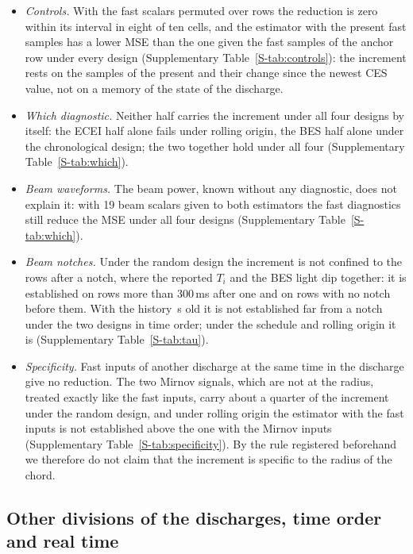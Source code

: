 \documentclass[11pt,a4paper]{article}
\newcommand{\Ti}{\ensuremath{T_i}}
\newcommand{\SuppTab}[1]{Supplementary Table~\ref{S-#1}}
\begin{document}
\begin{itemize}\setlength{\itemsep}{1pt}\setlength{\parskip}{0pt}
\item \emph{Controls.} With the fast scalars permuted over rows the reduction is zero
within its interval in eight of ten cells, and the estimator with the present fast
samples has a lower MSE than the one given the fast samples of the anchor row under every
design (\SuppTab{tab:controls}): the increment rests on the samples of the present and
their change since the newest CES value, not on a memory of the state of the discharge.
\item \emph{Which diagnostic.} Neither half carries the increment under all four designs
by itself: the ECEI half alone fails under rolling origin, the BES half alone under the
chronological design; the two together hold under all four (\SuppTab{tab:which}).
\item \emph{Beam waveforms.} The beam power, known without any diagnostic, does not
explain it: with 19 beam scalars given to both estimators the fast diagnostics still
reduce the MSE under all four designs (\SuppTab{tab:which}).
\item \emph{Beam notches.} Under the random design the increment is not confined to the
rows after a notch, where the reported \Ti{} and the BES light dip together: it is
established on rows more than 300\,ms after one and on rows with no notch before them.
With the history \AgeMedianS\,s old it is not established far from a notch under the two
designs in time order; under the schedule and rolling origin it is (\SuppTab{tab:tau}).
\item \emph{Specificity.} Fast inputs of another discharge at the same time in the
discharge give no reduction. The two Mirnov signals, which are not at the radius, treated
exactly like the fast inputs, carry about a quarter of the increment under the random
design, and under rolling origin the estimator with the fast inputs is not established
above the one with the Mirnov inputs (\SuppTab{tab:specificity}). By the rule registered beforehand we therefore do not
claim that the increment is specific to the radius of the chord.
\end{itemize}

\subsection{Other divisions of the discharges, time order and real time}
\label{sec:res:designs}
\end{document}
